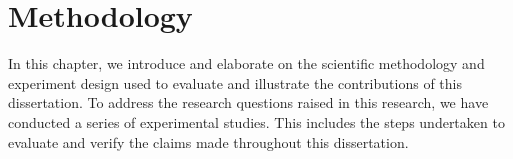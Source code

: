 \chapter*{Methodology}
In this chapter, we introduce and elaborate on the scientific methodology and experiment design used to evaluate and illustrate the contributions of this dissertation. To address the research questions raised in this research, we have conducted a series of experimental studies. This includes the steps undertaken to evaluate and verify the claims made throughout this dissertation. 










